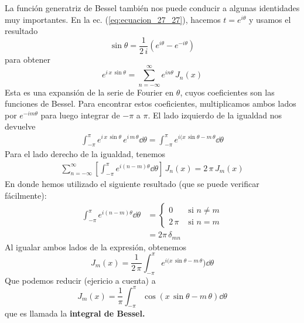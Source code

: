 \par
La función generatriz de Bessel también nos puede conducir a algunas identidades muy importantes. En la ec. (\ref{eq:ecuacion_27_27}), hacemos $t = e^{i \theta}$ y usamos el resultado
\begin{equation}
\sin \theta = \dfrac{1}{2 \, i} (e^{i \theta} - e^{-i \theta})
\label{eq:ecuacion_18_14}
\end{equation}
para obtener
\begin{equation}
e^{i  \, x \, \sin \theta} = \sum_{n=-\infty}^{\infty} e^{i n \theta} \, J_{n} (x)
\label{eq:ecuacion_27_29}
\end{equation}
Esta es una expansión de la serie de Fourier en $\theta$, cuyos coeficientes son las funciones de Bessel. Para encontrar estos coeficientes, multiplicamos ambos lados por $e^{-i m \theta}$ para luego integrar de $-\pi$ a $\pi$. El lado izquierdo de la igualdad nos devuelve
\begin{align*}
\int_{-\pi}^{\pi} e^{i \, x \, \sin \theta} \, e^{i \, m \,  \theta} \dd{\theta} = \int_{-\pi}^{\pi} e^{i (x \, \sin \theta -  m \,  \theta} \dd{\theta}
\end{align*}
Para el lado derecho de la igualdad, tenemos
\begin{align*}
\sum_{n=-\infty}^{\infty} \left[ \int_{-\pi}^{\pi} e^{i(n - m) \theta} \dd{\theta} \right] \, J_{n} (x) = 2 \, \pi \, J_{m}(x)
\end{align*}
En donde hemos utilizado el siguiente resultado (que se puede verificar fácilmente):
\begin{align*}
\int_{-\pi}^{\pi} e^{i(n - m) \theta} \dd{\theta} &= \begin{cases}
0 & \mbox{ si } n \neq m \\
2 \, \pi & \mbox{ si } n = m
\end{cases} \\
&= 2 \pi \, \delta_{mn}
\end{align*}
Al igualar ambos lados de la expresión, obtenemos
\begin{equation}
J_{m} (x) = \dfrac{1}{2 \, \pi} \int_{-\pi}^{\pi} e^{i (x \, \sin \theta -  m \, \theta}) \dd{\theta}
\label{eq:ecuacion_27_30}
\end{equation}
Que podemos reducir (ejericio a cuenta) a
\begin{equation}
J_{m} (x) = \dfrac{1}{\pi} \int_{-\pi}^{\pi} \cos (x \, \sin \theta -  m \, \theta) \dd{\theta}
\label{eq:ecuacion_27_31}
\end{equation}
que es llamada la \textbf{integral de Bessel.}
